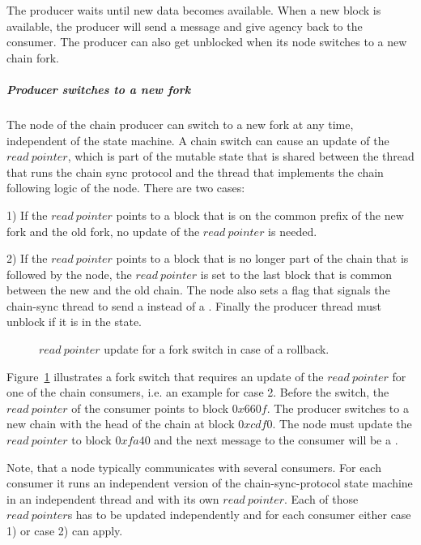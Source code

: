 \documentclass{report}
\theoremstyle{definition}{
  \newtheorem{lemma}{Lemma}[section] %
  \newtheorem{definition}[lemma]{Definition}
}
\theoremstyle{theorem}{
  \newtheorem{invariant}[lemma]{Invariant}
  \newtheorem{proofobligation}[lemma]{Proof Obligation}
}
\numberwithin{equation}{lemma}
\begin{document}
The producer waits until new data becomes available.
When a new block is available, the producer will
send a \RollForward{} message and give agency back to the consumer.
The producer can also get unblocked when its node switches to a new chain fork.

\subparagraph{Producer switches to a new fork}
The node of the chain producer can switch to a new fork at any time, independent of the
state machine.
A chain switch can cause an update of the $read~pointer$,
which is part of the mutable state that is shared between the thread that runs
the chain sync protocol and the thread that implements the chain following logic of the node.
There are two cases:

1) If the $read~pointer$ points to a block that is on the common prefix of the new
fork and the old fork, no update of the $read~pointer$ is needed.

2) If the $read~pointer$ points to a block that is no longer part of the chain that is followed by the node,
the $read~pointer$ is set to the last block that is common between the new and the old chain.
The node also sets a flag that signals the chain-sync thread to send a \RollBackward{} instead
of a \RollForward.
Finally the producer thread must unblock if it is in the \MustReply{} state.

\begin{figure}[h]
\begin{center}
\end{center}
\caption{$read~pointer$ update for a fork switch in case of a rollback.}
\label{read-pointer-rollback}
\end{figure}

Figure~\ref{read-pointer-rollback} illustrates a fork switch that requires an update of the $read~pointer$
for one of the chain consumers, i.e. an example for case 2.
Before the switch, the $read~pointer$ of the consumer points to block $0x660f$.
The producer switches to a new chain with the head of the chain at block $0xcdf0$.
The node must update the $read~pointer$ to block $0xfa40$ and the next message to the consumer
will be a \RollBackward.

Note, that a node typically communicates with several consumers. For each consumer it runs an independent
version of the chain-sync-protocol state machine in an independent thread and with its own $read~pointer$.
Each of those $read~pointer$s has to be updated independently and for each consumer
either case 1) or case 2) can apply.
\end{document}
